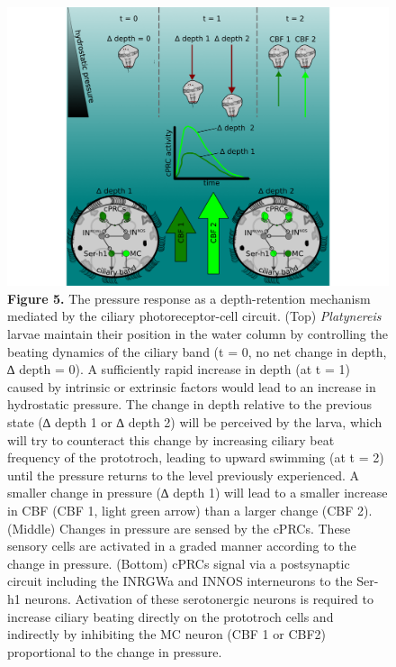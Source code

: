 \documentclass[
  11pt,
]{article}
\begin{document}
\begin{figure}[H]

{\centering \includegraphics[width=1\textwidth,height=\textheight]{Figures/Figure5.png}

}

\caption{\textbf{Figure 5.} The pressure response as a depth-retention
mechanism mediated by the ciliary photoreceptor-cell circuit. (Top)
\emph{Platynereis} larvae maintain their position in the water column by
controlling the beating dynamics of the ciliary band (t = 0, no net
change in depth, ∆ depth = 0). A sufficiently rapid increase in depth
(at t = 1) caused by intrinsic or extrinsic factors would lead to an
increase in hydrostatic pressure. The change in depth relative to the
previous state (∆ depth 1 or ∆ depth 2) will be perceived by the larva,
which will try to counteract this change by increasing ciliary beat
frequency of the prototroch, leading to upward swimming (at t = 2) until
the pressure returns to the level previously experienced. A smaller
change in pressure (∆ depth 1) will lead to a smaller increase in CBF
(CBF 1, light green arrow) than a larger change (CBF 2). (Middle)
Changes in pressure are sensed by the cPRCs. These sensory cells are
activated in a graded manner according to the change in pressure.
(Bottom) cPRCs signal via a postsynaptic circuit including the INRGWa
and INNOS interneurons to the Ser-h1 neurons. Activation of these
serotonergic neurons is required to increase ciliary beating directly on
the prototroch cells and indirectly by inhibiting the MC neuron (CBF 1
or CBF2) proportional to the change in pressure.}

\end{figure}%
\end{document}
